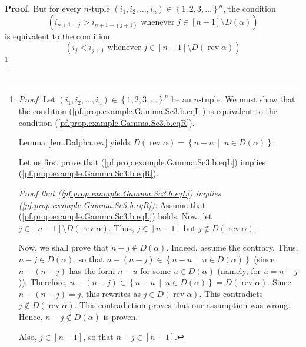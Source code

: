 \documentclass[numbers=enddot,12pt,final,onecolumn,notitlepage,abstracton]{scrartcl}
\theoremstyle{definition}
\newenvironment{proof}[1][Proof]{\noindent\textbf{#1.} }{\ \rule{0.5em}{0.5em}}
\newenvironment{verlong}{}{}
\begin{document}
\begin{verlong}
\begin{footnotesize}
\begin{proof}
But for every $n$-tuple $\left(  i_{1},i_{2},\ldots,i_{n}\right)  \in\left\{
1,2,3,\ldots\right\}  ^{n}$, the condition
\begin{equation}
\left(  i_{n+1-j}>i_{n+1-\left(  j+1\right)  }\text{ whenever }j\in\left[
n-1\right]  \setminus D\left(  \alpha\right)  \right)
\label{pf.prop.example.Gamma.Sc3.b.eqL}%
\end{equation}
is equivalent to the condition
\begin{equation}
\left(  i_{j}<i_{j+1}\text{ whenever }j\in\left[  n-1\right]  \setminus
D\left(  \operatorname*{rev}\alpha\right)  \right)
\label{pf.prop.example.Gamma.Sc3.b.eqR}%
\end{equation}
\footnote{\textit{Proof.} Let $\left(  i_{1},i_{2},\ldots,i_{n}\right)
\in\left\{  1,2,3,\ldots\right\}  ^{n}$ be an $n$-tuple. We must show that the
condition (\ref{pf.prop.example.Gamma.Sc3.b.eqL}) is equivalent to the
condition (\ref{pf.prop.example.Gamma.Sc3.b.eqR}).
\par
Lemma \ref{lem.Dalpha.rev} yields $D\left(  \operatorname*{rev}\alpha\right)
=\left\{  n-u\ \mid\ u\in D\left(  \alpha\right)  \right\}  $.
\par
Let us first prove that (\ref{pf.prop.example.Gamma.Sc3.b.eqL}) implies
(\ref{pf.prop.example.Gamma.Sc3.b.eqR}).
\par
\textit{Proof that (\ref{pf.prop.example.Gamma.Sc3.b.eqL}) implies
(\ref{pf.prop.example.Gamma.Sc3.b.eqR}):} Assume that
(\ref{pf.prop.example.Gamma.Sc3.b.eqL}) holds. Now, let $j\in\left[
n-1\right]  \setminus D\left(  \operatorname*{rev}\alpha\right)  $. Thus,
$j\in\left[  n-1\right]  $ but $j\notin D\left(  \operatorname*{rev}%
\alpha\right)  $.
\par
Now, we shall prove that $n-j\notin D\left(  \alpha\right)  $. Indeed, assume
the contrary. Thus, $n-j\in D\left(  \alpha\right)  $, so that $n-\left(
n-j\right)  \in\left\{  n-u\ \mid\ u\in D\left(  \alpha\right)  \right\}  $
(since $n-\left(  n-j\right)  $ has the form $n-u$ for some $u\in D\left(
\alpha\right)  $ (namely, for $u=n-j$)). Therefore, $n-\left(  n-j\right)
\in\left\{  n-u\ \mid\ u\in D\left(  \alpha\right)  \right\}  =D\left(
\operatorname*{rev}\alpha\right)  $. Since $n-\left(  n-j\right)  =j$, this
rewrites as $j\in D\left(  \operatorname*{rev}\alpha\right)  $. This
contradicts $j\notin D\left(  \operatorname*{rev}\alpha\right)  $. This
contradiction proves that our assumption was wrong. Hence, $n-j\notin D\left(
\alpha\right)  $ is proven.
\par
Also, $j\in\left[  n-1\right]  $, so that $n-j\in\left[  n-1\right]  $.
}
\end{proof}
\end{footnotesize}
\end{verlong}
\end{document}
